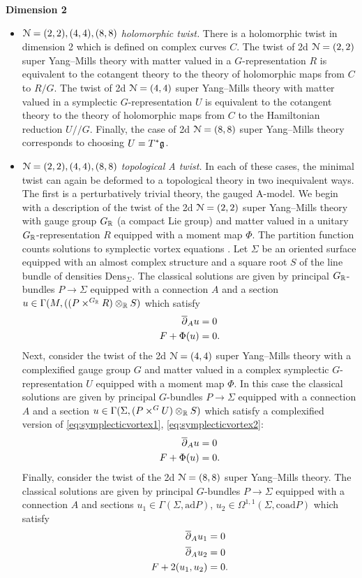 \documentclass[10pt, oneside]{article}
\newcommand{\Dens}{\mathrm{Dens}}
\newcommand{\ham}{/\!\!/}
\begin{document}
\textbf{Dimension 2}
\begin{itemize}
 \item \emph{$\mathcal{N}=(2,2), (4,4), (8,8)$ holomorphic twist.} There is a holomorphic twist in dimension 2 which is defined on complex curves $C$. The twist of 2d $\mathcal N=(2, 2)$ super Yang--Mills theory with matter valued in a $G$-representation $R$ is equivalent to the cotangent theory to the theory of holomorphic maps from $C$ to $R/G$. The twist of 2d $\mathcal N=(4, 4)$ super Yang--Mills theory with matter valued in a symplectic $G$-representation $U$ is equivalent to the cotangent theory to the theory of holomorphic maps from $C$ to the Hamiltonian reduction $U\ham G$. Finally, the case of 2d $\mathcal N=(8, 8)$ super Yang--Mills theory corresponds to choosing $U=T^*\mathfrak g$.
 \item \emph{$\mathcal{N}=(2,2), (4,4), (8,8)$ topological A twist.} In each of these cases, the minimal twist can again be deformed to a topological theory in two inequivalent ways.  The first is a perturbatively trivial theory, the gauged A-model. We begin with a description of the twist of the 2d $\mathcal N=(2, 2)$ super Yang--Mills theory with gauge group $G_\mathbb R$ (a compact Lie group) and matter valued in a unitary $G_\mathbb R$-representation $R$ equipped with a moment map $\Phi$. The partition function counts solutions to symplectic vortex equations \cite{CGMRS}. Let $\Sigma$ be an oriented surface equipped with an almost complex structure and a square root $S$ of the line bundle of densities $\Dens_\Sigma$. The classical solutions are given by principal $G_\mathbb R$-bundles $P\rightarrow \Sigma$ equipped with a connection $A$ and a section $u\in\Gamma(M, ((P\times^{G_\mathbb R} R)\otimes_\mathbb R S)$ which satisfy
\begin{align}
\overline{\partial}_A u &= 0 \label{eq:symplecticvortex1} \\
F + \Phi(u) &= 0. \label{eq:symplecticvortex2}
\end{align}
Next, consider the twist of the 2d $\mathcal N=(4, 4)$ super Yang--Mills theory with a complexified gauge group $G$ and matter valued in a complex symplectic $G$-representation $U$ equipped with a moment map $\Phi$. In this case the classical solutions are given by principal $G$-bundles $P\rightarrow \Sigma$ equipped with a connection $A$ and a section $u\in\Gamma(\Sigma, (P\times^G U)\otimes_\mathbb R S)$ which satisfy a complexified version of \eqref{eq:symplecticvortex1}, \eqref{eq:symplecticvortex2}:
\begin{align}
\overline{\partial}_A u &= 0 \\
F + \Phi(u) &= 0.
\end{align}
Finally, consider the twist of the 2d $\mathcal N=(8, 8)$ super Yang--Mills theory. The classical solutions are given by principal $G$-bundles $P\rightarrow \Sigma$ equipped with a connection $A$ and sections $u_1\in\Gamma(\Sigma, \mathrm{ad} P)$, $u_2\in\Omega^{1, 1}(\Sigma, \mathrm{coad} P)$ which satisfy
\begin{align}
\overline{\partial}_A u_1 &= 0 \\
\overline{\partial}_A u_2 &= 0 \\
F + 2(u_1, u_2) &= 0.
\end{align}


\end{itemize}
\end{document}
